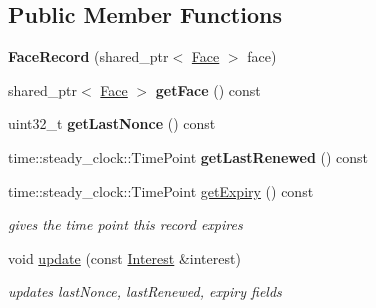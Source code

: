 \subsection*{Public Member Functions}
\begin{DoxyCompactItemize}
\item 
{\bfseries Face\+Record} (shared\+\_\+ptr$<$ \hyperlink{classnfd_1_1Face}{Face} $>$ face)\hypertarget{classnfd_1_1pit_1_1FaceRecord_abac4cf51d76228ad6dbc23d8c56e76b8}{}\label{classnfd_1_1pit_1_1FaceRecord_abac4cf51d76228ad6dbc23d8c56e76b8}

\item 
shared\+\_\+ptr$<$ \hyperlink{classnfd_1_1Face}{Face} $>$ {\bfseries get\+Face} () const\hypertarget{classnfd_1_1pit_1_1FaceRecord_a6ff4c5d1e7f49cfefe83464fcaa6fe44}{}\label{classnfd_1_1pit_1_1FaceRecord_a6ff4c5d1e7f49cfefe83464fcaa6fe44}

\item 
uint32\+\_\+t {\bfseries get\+Last\+Nonce} () const\hypertarget{classnfd_1_1pit_1_1FaceRecord_a99e10831e9df270cdc102d0c7c30c718}{}\label{classnfd_1_1pit_1_1FaceRecord_a99e10831e9df270cdc102d0c7c30c718}

\item 
time\+::steady\+\_\+clock\+::\+Time\+Point {\bfseries get\+Last\+Renewed} () const\hypertarget{classnfd_1_1pit_1_1FaceRecord_a07ec06ecc875fbe29d34324e25ea9cac}{}\label{classnfd_1_1pit_1_1FaceRecord_a07ec06ecc875fbe29d34324e25ea9cac}

\item 
time\+::steady\+\_\+clock\+::\+Time\+Point \hyperlink{classnfd_1_1pit_1_1FaceRecord_a89e17bac83d5040ee4d952d01f5fd718}{get\+Expiry} () const
\begin{DoxyCompactList}\small\item\em gives the time point this record expires \end{DoxyCompactList}\item 
void \hyperlink{classnfd_1_1pit_1_1FaceRecord_a3c6d92b8e27aa86c269c8dc64401dee7}{update} (const \hyperlink{classndn_1_1Interest}{Interest} \&interest)\hypertarget{classnfd_1_1pit_1_1FaceRecord_a3c6d92b8e27aa86c269c8dc64401dee7}{}\label{classnfd_1_1pit_1_1FaceRecord_a3c6d92b8e27aa86c269c8dc64401dee7}

\begin{DoxyCompactList}\small\item\em updates last\+Nonce, last\+Renewed, expiry fields \end{DoxyCompactList}\end{DoxyCompactItemize}


